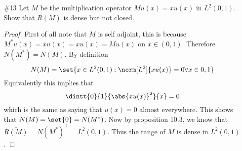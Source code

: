 \documentclass[11pt, oneside]{article}
\begin{document}
\begin{enumerate}
\begin{proof}
      This conclusion may be false if that operator is not self-adjoint.
      Consider the operator $S_+$ on $\mcl^2$.
      We have already shown that $S_+^* = S_-$ so $S_+$ is not self-adjoint.
      However $\norm{S_+x} = \norm{x}$ for all $x \in \mcl^2$, so with $c = 1$
      $S_+$ satisfies $\norm{S_+ x} \ge c \norm{x}$ for all $x \in \mcl^2$.
      However $R(S_+) = \set{x \in \mcl^2 : x_1 = 0}$, so $S_+ u = x$ will not
      have a solution if $x_1 \neq 0$.
    \end{proof}

  \pagebreak
  \item[\#13] %
    Let $M$ be the multiplication operator $Mu(x) = xu(x)$ in $L^2(0, 1)$.
    Show that $R(M)$ is dense but not closed.

    \begin{proof}
      First of all note that $M$ is self adjoint, this is because
      $M^* u(x) = \overline{x} u(x) = xu(x) = Mu(x)$ on $x \in (0, 1)$.
      Therefore $N(M^*) = N(M)$.
      By definition
      \[
        N(M) = \set{x \in L^2(0, 1): \norm[L^2]{xu(x)} = 0 \forall x \in {0, 1}}
      \]
      Equivalently this implies that
      \[
        \dintt{0}{1}{\abs{xu(x)}^2}{x} = 0
      \]
      which is the same as saying that $u(x) = 0$ almost everywhere.
      This shows that $N(M) = \set{0} = N(M^*)$.
      Now by proposition 10.3, we know that
      $\overline{R(M)} = N(M^*)^{\perp} = L^2(0,1)$.
      Thus the range of $M$ is dense in $L^2(0, 1)$.


\end{proof}
\end{enumerate}
\end{document}
